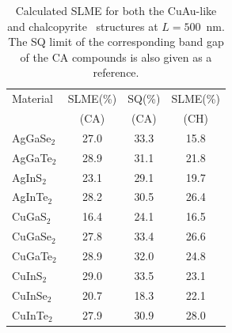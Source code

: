 \begin{refsection}
\begin{table}
\centering
\captionsetup{width=0.9\textwidth}
\renewcommand{\arraystretch}{1.2} 
\caption{Calculated \gls{SLME} for both the \mbox{CuAu-like} and 
chalcopyrite~\cite{Yu2012} structures at $L=500$~\si{\nano\meter}. The \gls{SQ} limit of the corresponding band 
gap of the \gls{CA} compounds is also given as a reference.} 
\label{slme:tab-SLME} 
\begin{tabular}{l@{\hskip 1em}c@{\hskip 0.8em}c@{\hskip0.8em}c} 
\hline 
Material & \gls{SLME}(\%) & \gls{SQ}(\%) & \gls{SLME}(\%)\\ 
		 &  (CA)	&  (CA) &  (\gls{CH})	 \\\hline 
AgGaSe$_2$ & 27.0 & 33.3 & 15.8 \\ 
AgGaTe$_2$ & 28.9 & 31.1 & 21.8 \\ 
AgInS$_2$  & 23.1 & 29.1 & 19.7 \\ 
AgInTe$_2$ & 28.2 & 30.5 & 26.4 \\ 
CuGaS$_2$  & 16.4 & 24.1 & 16.5 \\ 
CuGaSe$_2$ & 27.8 & 33.4 & 26.6 \\ 
CuGaTe$_2$ & 28.9 & 32.0 & 24.8 \\ 
CuInS$_2$  & 29.0 & 33.5 & 23.1 \\ 
CuInSe$_2$ & 20.7 & 18.3 & 22.1 \\ 
CuInTe$_2$ & 27.9 & 30.9 & 28.0 \\ \hline 
\end{tabular} 
\end{table}


\end{refsection}
